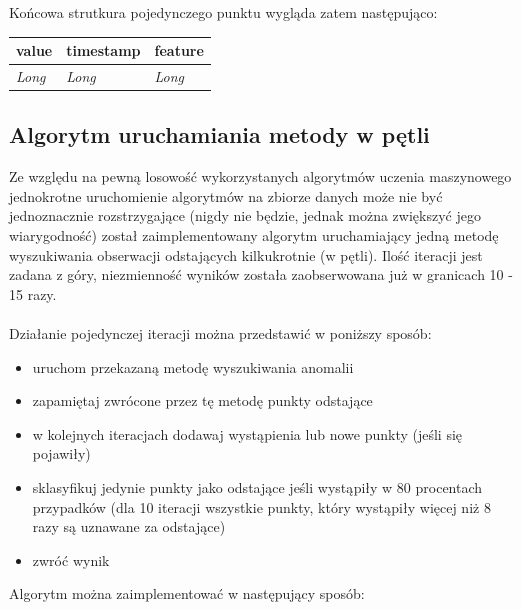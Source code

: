 \documentclass[eng,printmode]{mgr}
\begin{document}
Końcowa strutkura pojedynczego punktu wygląda zatem następująco:
\\
\begingroup
\fontsize{10pt}{12pt}\selectfont

\begin{tabu} to 0.9\textwidth { | X[l] | X[l] | X[l] |}
\hline
\textbf{value} & \textbf{timestamp} & \textbf{feature} \\
\hline
\textit{Long}  & \textit{Long}  & \textit{Long} \\
\hline
\end{tabu}
\endgroup

\subsection{Algorytm uruchamiania metody w pętli}
Ze względu na pewną losowość wykorzystanych algorytmów uczenia maszynowego jednokrotne uruchomienie algorytmów na zbiorze danych może nie być jednoznacznie rozstrzygające (nigdy nie będzie, jednak można zwiększyć jego wiarygodność) został zaimplementowany algorytm uruchamiający jedną metodę wyszukiwania obserwacji odstających kilkukrotnie (w pętli). Ilość iteracji jest zadana z góry, niezmienność wyników została zaobserwowana już w granicach 10 - 15 razy. 
\\\\
Działanie pojedynczej iteracji można przedstawić w poniższy sposób:

\begin{itemize}
  \item uruchom przekazaną metodę wyszukiwania anomalii
  \item zapamiętaj zwrócone przez tę metodę punkty odstające
  \item w kolejnych iteracjach dodawaj wystąpienia lub nowe punkty (jeśli się pojawiły)
  \item sklasyfikuj jedynie punkty jako odstające jeśli wystąpiły w 80 procentach przypadków (dla 10 iteracji wszystkie punkty, który wystąpiły więcej niż 8 razy są uznawane za odstające)
  \item zwróć wynik
\end{itemize}

Algorytm można zaimplementować w następujący sposób:
\end{document}
